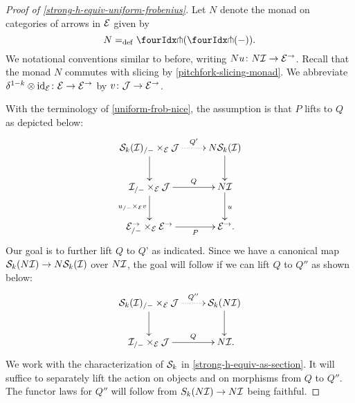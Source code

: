 \documentclass[reqno,10pt,a4paper,oneside,draft]{amsart}
\begin{document}
\begin{proof}[Proof of \cref{strong-h-equiv-uniform-frobenius}]
Let $N$ denote the monad on categories of arrows in $\cal{E}$ given by
\[
  N \defeq \liftl{(\liftr{(-)})}
.\]
We notational conventions similar to before, \eg writing $N u \co N \cal{I} \to \cal{E}^\to$.
Recall that the monad $N$ commutes with slicing by \cref{pitchfork-slicing-monad}.
We abbreviate $\kcylinv \otimes \id_{\cal{E}} \co \cal{E} \to \cal{E}^\to$ by $v \co \cal{J} \to \cal{E}^\to$.

With the terminology of \cref{uniform-frob-nice}, the assumption is that $P$ lifts to $Q$ as depicted below:
\[
\xymatrix{
  \cal{S}_k(\cal{I})_{/-} \times_{\cal{E}} \cal{J}
  \ar@{.>}[r]^-{Q'}
  \ar[d]
&
  N \cal{S}_k(\cal{I})
  \ar[d]
\\
  \cal{I}_{/-} \times_{\cal{E}} \cal{J}
  \ar[r]^-{Q}
  \ar[d]_{u_{/-} \times_{\cal{E}} v}
&
  N \cal{I}
  \ar[d]^{u}
\\
  \cal{E}^\to_{/-} \times_{\cal{E}} \cal{E}^\to
  \ar[r]_-{P}
&
  \cal{E}^\to
\rlap{.}}
\]
Our goal is to further lift $Q$ to $Q$' as indicated.
Since we have a canonical map $\cal{S}_k(N \cal{I}) \to N \cal{S}_k(\cal{I})$ over $N \cal{I}$, the goal will follow if we can lift $Q$ to $Q''$ as shown below:
\begin{equation} \label{strong-h-equiv-uniform-frobenius:goal}
\xycenter{
  \cal{S}_k(\cal{I})_{/-} \times_{\cal{E}} \cal{J}
  \ar@{.>}[r]^-{Q''}
  \ar[d]
&
  \cal{S}_k(N \cal{I})
  \ar[d]
\\
  \cal{I}_{/-} \times_{\cal{E}} \cal{J}
  \ar[r]^-{Q}
&
  N \cal{I}
\rlap{.}}
\end{equation}
We work with the characterization of $\cal{S}_k$ in \cref{strong-h-equiv-as-section}.
It will suffice to separately lift the action on objects and on morphisms from $Q$ to $Q''$.
The functor laws for $Q''$ will follow from $S_k(N \cal{I}) \to N \cal{I}$ being faithful.

\medskip


\end{proof}
\end{document}
